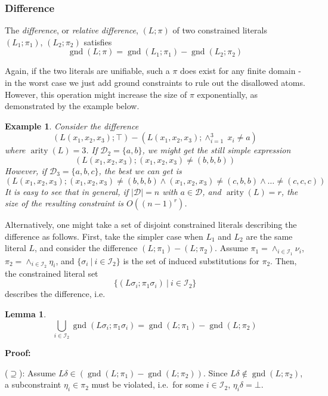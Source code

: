 \documentclass[a4paper]{article}
\newcommand{\mGnd}{\operatorname{gnd}} \newcommand{\mLVar}{\operatorname{lvar}} \newcommand{\mRVar}{\operatorname{rvar}} \newcommand{\mDmn}{\operatorname{dom}} \newcommand{\mRng}{\operatorname{rng}} \newcommand{\mMGU}{\operatorname{mgu}} \newcommand{\mDef}{\operatorname{def}} \newcommand{\mDomain}{\mathcal{D}} \newcommand{\mVar}{\operatorname{var}}
\newcommand{\startproof}{{\bf Proof:~}}
\newtheorem{example}[defi]{Example}
\newtheorem{lemm}[defi]{Lemma}
\begin{document}
\subsubsection*{Difference}

The  \emph{difference}, or \emph{relative difference}, $(L; \pi)$ of two constrained literals $(L_1; \pi_1)$, $(L_2; \pi_2)$ satisfies 
\[\mGnd(L; \pi) = \mGnd(L_1; \pi_1) - \mGnd(L_2; \pi_2)\]

Again, if the two literals are unifiable, such a $\pi$ does exist for any finite domain - in the worst case we just add ground constraints to rule out the disallowed atoms.
However, this operation might increase the size of $\pi$ exponentially, as demonstrated by the example below.

\begin{example}\label{a-dmcDiffEx1}
Consider the difference 
\[(L(x_1, x_2, x_3); \top) - (L(x_1, x_2, x_3); \land_{i=1}^3~x_i \ne a)\]
where $\operatorname{arity}(L) = 3$. 
If $\mDomain_2 = \{ a, b \}$, we might get the still simple expression 
\[(L(x_1, x_2, x_3); (x_1, x_2, x_3) \ne (b,b,b))\]
However, if $\mDomain_3 = \{ a, b, c \}$, the best we can get is 
\[(L(x_1, x_2, x_3); (x_1,x_2,x_3) \ne (b,b,b) \land (x_1,x_2,x_3) \ne (c, b, b) \land \dots \ne (c,c,c))\]
It is easy to see that in general, if $|\mDomain| = n$ with $a \in \mDomain$, and $\operatorname{arity}(L) = r$, 
the size of the resulting constraint is $O((n-1)^r)$.
\end{example}

Alternatively, one might take a set of disjoint constrained literals describing the difference as follows. 
First, take the simpler case when $L_1$ and  $L_2$ are the same literal $L$, and consider the difference $(L; \pi_1) - (L; \pi_2)$. 
Assume $\pi_1 = \land_{i \in \mathcal{I}_1} \nu_i$, $\pi_2 = \land_{i \in \mathcal{I}_2} \eta_i$, 
and $\{\sigma_i~|~i \in \mathcal{I}_2\}$ is the set of induced substitutions for $\pi_2$.
Then, the constrained literal set 
\[\{ (L\sigma_i; \pi_1\sigma_i)~|~i \in \mathcal{I}_2 \}\]
describes the difference, i.e.\

\begin{lemm}
\[\bigcup_{i \in \mathcal{I}_2}\mGnd(L\sigma_i; \pi_1\sigma_i) = \mGnd(L; \pi_1) - \mGnd(L; \pi_2)\]
\end{lemm}

\noindent
\startproof 

($\supseteq$): Assume $L\delta \in (\mGnd(L; \pi_1) - \mGnd(L; \pi_2))$. 
Since $L\delta\notin\mGnd(L; \pi_2)$, a subconstraint $\eta_i \in \pi_2$ must be violated, i.e.\ 
for some $i \in \mathcal{I}_2$, $\eta_i\delta = \bot$. 
\end{document}
